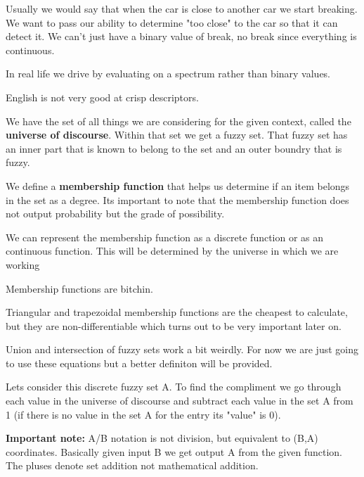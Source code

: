 \documentclass{article}
\begin{document}

Usually we would say that when the car is close to another car we start breaking. We want to pass our ability to determine "too close" to the car so that it can detect it. We can't just have a binary value of break, no break since everything is continuous.


In real life we drive by evaluating on a spectrum rather than binary values.


English is not very good at crisp descriptors.




We have the set of all things we are considering for the given context, called the \textbf{universe of discourse}. Within that set we get a fuzzy set. That fuzzy set has an inner part that is known to belong to the set and an outer boundry that is fuzzy.


We define a \textbf{membership function} that helps us determine if an item belongs in the set as a degree. Its important to note that the membership function does not output probability but the grade of possibility.


We can represent the membership function as a discrete function or as an continuous function. This will be determined by the universe in which we are working


Membership functions are bitchin.

Triangular and trapezoidal membership functions are the cheapest to calculate, but they are non-differentiable which turns out to be very important later on.


Union and intersection of fuzzy sets work a bit weirdly. For now we are just going to use these equations but a better definiton will be provided.


Lets consider this discrete fuzzy set A. To find the compliment we go through each value in the universe of discourse and subtract each value in the set A from 1 (if there is no value in the set A for the entry its "value" is 0).

\textbf{Important note:} A/B notation is not division, but equivalent to (B,A) coordinates. Basically given input B we get output A from the given function. The pluses denote set addition not mathematical addition.
\end{document}

